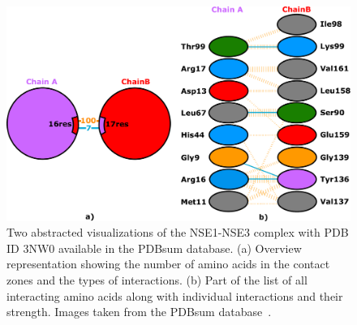 \documentclass{bmcart}
\begin{document}
\begin{backmatter}
\begin{figure}[h!]
  \centering	
  \includegraphics[width=\columnwidth]{images/figure2.pdf}
  \caption{
    Two abstracted visualizations of the NSE1-NSE3 complex with PDB ID 3NW0 available in the PDBsum database. (a) Overview representation showing the number of amino acids in the contact zones and the types of interactions. (b) Part of the list of all interacting amino acids along with individual interactions and their strength. Images taken from the PDBsum database~\cite{pdbsum}.}
    \label{fig:pdbsum}
\end{figure}


\end{backmatter}
\end{document}
